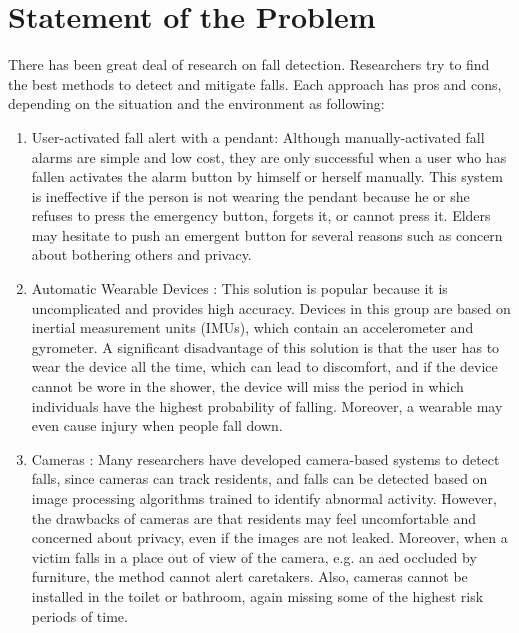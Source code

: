 \section{Statement of the Problem}

There has been great deal of research on fall detection. Researchers try to find the best methods to detect and mitigate falls. Each approach has pros and cons, depending on the situation and the environment as following:
\begin{enumerate}

    \item User-activated fall alert with a pendant: Although manually-activated fall alarms are simple and low cost, they are only successful when a user who has fallen activates the alarm button by himself or herself manually. This system is ineffective if the person is not wearing the pendant because he or she refuses to press the emergency button, forgets it, or cannot press it. Elders may hesitate to push an emergent button for several reasons such as concern about bothering others and privacy.

    \item Automatic Wearable Devices \cite{degen_jaeckel_rufer_wyss_2003, yang_hsu_2010, rihana_mondalak_2016}: This solution is popular because it is uncomplicated and provides high accuracy. Devices in this group are based on inertial measurement units (IMUs), which contain an accelerometer and gyrometer. A significant disadvantage of this solution is that the user has to wear the device all the time, which can lead to discomfort, and if the device cannot be wore in the shower, the device will miss the period in which individuals have the highest probability of falling. Moreover, a wearable may even cause injury when people fall down.

    \item Cameras \cite{tsai_hsu_2019, ramirez_velastin_meza_fabregas_makris_farias_2021,taufeeque_koita_spicher_deserno_2021}: Many researchers have developed camera-based systems to detect falls, since cameras can track residents, and falls can be detected based on image processing algorithms trained to identify abnormal activity. However, the drawbacks of cameras are that residents may feel uncomfortable and concerned about privacy, even if the images are not leaked. Moreover, when a victim falls in a place out of view of the camera, e.g. an aed occluded by furniture, the method cannot alert caretakers. Also, cameras cannot be installed in the toilet or bathroom, again missing some of the highest risk periods of time.


\end{enumerate}

